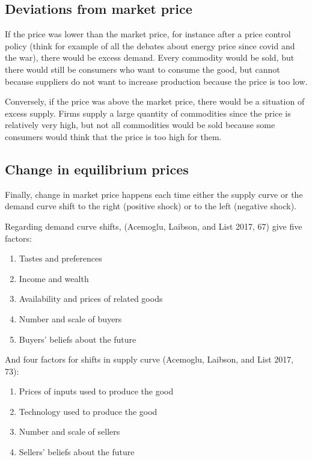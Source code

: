 \documentclass[
  letterpaper,
  DIV=11,
  numbers=noendperiod]{scrreprt}
\providecommand{\tightlist}{%
  \setlength{\itemsep}{0pt}\setlength{\parskip}{0pt}}\usepackage{longtable,booktabs,array}
\begin{document}
\hypertarget{deviations-from-market-price}{%
\subsection{Deviations from market
price}\label{deviations-from-market-price}}

If the price was lower than the market price, for instance after a price
control policy (think for example of all the debates about energy price
since covid and the war), there would be excess demand. Every commodity
would be sold, but there would still be consumers who want to consume
the good, but cannot because suppliers do not want to increase
production because the price is too low.

Conversely, if the price was above the market price, there would be a
situation of excess supply. Firms supply a large quantity of commodities
since the price is relatively very high, but not all commodities would
be sold because some consumers would think that the price is too high
for them.

\hypertarget{change-in-equilibrium-prices}{%
\subsection{Change in equilibrium
prices}\label{change-in-equilibrium-prices}}

Finally, change in market price happens each time either the supply
curve or the demand curve shift to the right (positive shock) or to the
left (negative shock).

Regarding demand curve shifts, (Acemoglu, Laibson, and List 2017, 67)
give five factors:

\begin{enumerate}
\def\labelenumi{\arabic{enumi}.}
\tightlist
\item
  Tastes and preferences
\item
  Income and wealth
\item
  Availability and prices of related goods
\item
  Number and scale of buyers
\item
  Buyers' beliefs about the future
\end{enumerate}

And four factors for shifts in supply curve (Acemoglu, Laibson, and List
2017, 73):

\begin{enumerate}
\def\labelenumi{\arabic{enumi}.}
\tightlist
\item
  Prices of inputs used to produce the good
\item
  Technology used to produce the good
\item
  Number and scale of sellers
\item
  Sellers' beliefs about the future
\end{enumerate}
\end{document}
